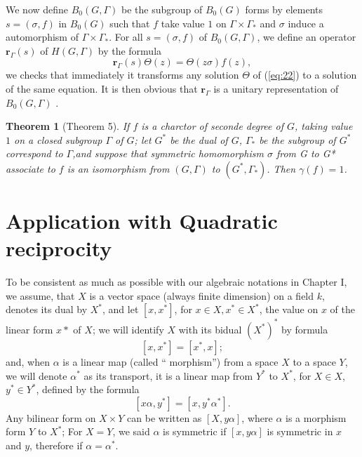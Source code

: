 \documentclass[12pt]{amsart}
\newtheorem{thm}{Theorem}
\def\br{{\mathbf{r}}}
\newcounter{ssection}
\renewcommand{\subsection}{
  \addtocounter{ssection}{1}{\bf  \arabic{ssection}.\  }}
\begin{document}
\subsection{}
We now define  $B_0(G, \Gamma)$ be the subgroup of $B_0(G)$ 
forms by elements $s=(\sigma, f)$ in $B_0(G)$ such that
$f$ take value $1$ on $\Gamma\times \Gamma_*$ and $\sigma$ 
induce a automorphism of $\Gamma\times \Gamma_*$. For all 
$s=(\sigma, f)$ of $B_0(G,\Gamma)$, we define an operator 
$\br_\Gamma(s)$ of $H(G,\Gamma)$ by the formula
\begin{equation}\label{eq:25}
\br_\Gamma(s)\Theta(z) = \Theta(z\sigma)f(z),
\end{equation} 
we checks that immediately it transforms 
any solution $\Theta$ of (\ref{eq:22}) 
to a solution of the same equation.
It is then obvious that $\br_\Gamma$ is a unitary representation of $B_0(G, \Gamma)$
.

\subsection{}
\begin{thm}[Theorem 5]
If $f$ is a charctor of seconde degree of $G$, 
taking value $1$ on a closed subgroup $\Gamma$ of $G$;
let $G^*$ be the dual of $G$, $\Gamma_*$ be the
subgroup of $G^*$ correspond to $\Gamma$,and 
suppose that symmetric homomorphism  $\sigma$ from G to G* associate to $f$
is an isomorphism from $(G, \Gamma)$ to $(G^*, \Gamma_*)$.  
Then $\gamma(f)=1$.
\end{thm}

\setcounter{ssection}{22}

\section{Application  with Quadratic reciprocity}
\subsection{}
To be consistent as much as possible with our algebraic notations in Chapter I,
we assume, that $X$ is a vector space (always finite dimension) on a field $k$,
denotes its dual by $X^*$, and let  $[x, x^*]$, for $x\in X, x^* \in X^*$,
the value on $x$ of the linear form $x*$ of $X$;
we will identify $X$ with its bidual $(X^*)^*$ 
by  formula 
\[
[x, x^*] = [x^*, x];
\]
and, when $\alpha$ is a linear map (called `` morphism'') from a space $X$ 
to a space $Y$, we will denote $\alpha^*$ as its transport, 
it is a linear map from $Y^*$ to $X^*$, for $X \in X$, $y^* \in Y^*$, 
defined by the formula 
\[
[x\alpha, y^*] = [x, y^*\alpha^*].
\]
Any bilinear form on $X\times Y$ can be written as $[X, y\alpha]$,
where $\alpha$ is a morphism form $Y$ to $X^*$;
For $X=Y$, we said $\alpha$ is symmetric if $[x, y\alpha]$
 is symmetric in $x$ and $y$, therefore if $\alpha=\alpha^*$.
\end{document}
